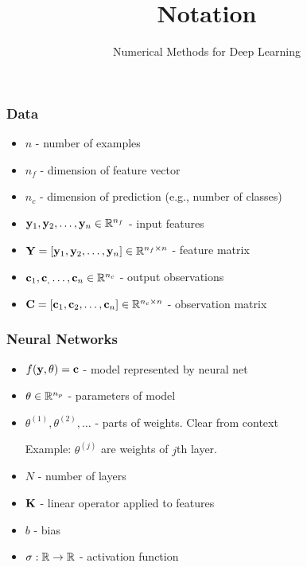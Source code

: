 \documentclass[12pt,fleqn]{beamer}
\title[Notations]{Notation}
\subtitle{Numerical Methods for Deep Learning}
\date{}
\begin{document}
\makebeamertitle

\begin{frame}
	\frametitle{Data}
	
	\begin{itemize}
		\item $n$ - number of examples
		\item $n_f$ - dimension of feature vector
		\item $n_c$ - dimension of prediction (e.g., number of classes)
		\item ${\bf y}_1,{\bf y}_2,\ldots,{\bf y}_n \in\mathbb{R}^{n_f}$ - input features
		\item ${\bf Y} = \left[{\bf y}_1,{\bf y}_2,\ldots,{\bf y}_n \right] \in \mathbb{R}^{n_f \times n}$ - feature matrix
		\item ${\bf c}_1,{\bf c}_,\ldots,{\bf c}_n \in \mathbb{R}^{n_c}$ - output observations 
		\item ${\bf C} = \left[{\bf c}_1, {\bf c}_2,\ldots,{\bf c}_n\right] \in \mathbb{R}^{n_c \times n}$ - observation matrix
	\end{itemize}
\end{frame}

\begin{frame}
	\frametitle{Neural Networks}
	
	\begin{itemize}
		\item $f({\bf y},\theta) = {\bf c}$ - model represented by neural net
		\item $\theta \in \mathbb{R}^{n_p}$ - parameters of model
		\item $\theta^{(1)}, \theta^{(2)}, \ldots$ - parts of weights. Clear from context
		
		Example: $\theta^{(j)}$ are weights of $j$th layer.
		\item $N$ - number of layers
		\item ${\bf K}$ - linear operator applied to features
		\item $b$    - bias
		\item $\sigma : \mathbb{R}\to\mathbb{R}$ - activation function
	\end{itemize}
\end{frame}
\end{document}
